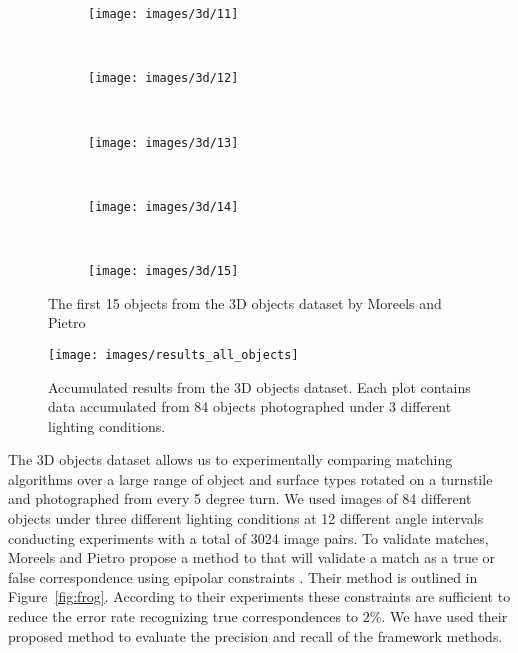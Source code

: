 \documentclass[journal]{IEEEtran}
\begin{document}
\begin{figure}[t]
    \begin{subfigure}[t]{0.19\columnwidth}
        \centering
        \texttt{[image: images/3d/11]}
    \end{subfigure}%
    ~ %
    \begin{subfigure}[t]{0.19\columnwidth}
        \centering
        \texttt{[image: images/3d/12]}
    \end{subfigure}%
    ~ %
    \begin{subfigure}[t]{0.19\columnwidth}
        \centering
        \texttt{[image: images/3d/13]}
    \end{subfigure}%
    ~ %
    \begin{subfigure}[t]{0.19\columnwidth}
        \centering
        \texttt{[image: images/3d/14]}
    \end{subfigure}%
    ~ %
    \begin{subfigure}[t]{0.19\columnwidth}
        \centering
        \texttt{[image: images/3d/15]}
    \end{subfigure}%
    \vspace{1.5 mm}

    \caption{The first 15 objects from the 3D objects dataset by Moreels
    and Pietro \cite{moreels2007evaluation}}
    \label{fig:3d_objects}
\end{figure}

\begin{figure*}[ht]
	\centering
    \texttt{[image: images/results\_all\_objects]}
    \caption{Accumulated results from the 3D objects dataset. Each plot 
    contains data accumulated from 84 objects photographed under 3 
different lighting conditions.}
    \label{fig:all_objects}
\end{figure*}


The 3D objects dataset allows us to experimentally comparing matching 
algorithms over a large range of object and surface types rotated on a 
turnstile and photographed from every 5 degree turn. We used images of 
84 different objects under three different lighting conditions at 12 
different angle intervals conducting experiments with a total of 3024 
image pairs.  To validate matches, Moreels and Pietro propose a method 
to that will validate a match as a true or false correspondence using 
epipolar constraints \cite[p.  266]{moreels2007evaluation}.  Their 
method is outlined in Figure~\ref{fig:frog}.  According to their 
experiments these constraints are sufficient to reduce the error rate 
recognizing true correspondences to $2\%$. We have used their proposed 
method to evaluate the precision and recall of the framework methods.
\end{document}
